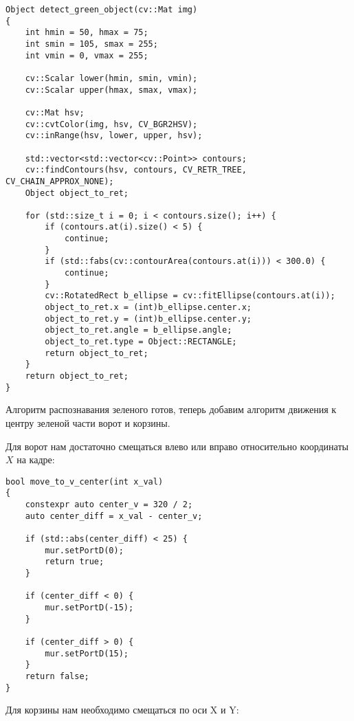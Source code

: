 \begin{verbatim}
Object detect_green_object(cv::Mat img)
{
    int hmin = 50, hmax = 75;
    int smin = 105, smax = 255;
    int vmin = 0, vmax = 255;

    cv::Scalar lower(hmin, smin, vmin);
    cv::Scalar upper(hmax, smax, vmax);

    cv::Mat hsv;
    cv::cvtColor(img, hsv, CV_BGR2HSV);
    cv::inRange(hsv, lower, upper, hsv);

    std::vector<std::vector<cv::Point>> contours;
    cv::findContours(hsv, contours, CV_RETR_TREE, CV_CHAIN_APPROX_NONE);
    Object object_to_ret;

    for (std::size_t i = 0; i < contours.size(); i++) {
        if (contours.at(i).size() < 5) {
            continue;
        }
        if (std::fabs(cv::contourArea(contours.at(i))) < 300.0) {
            continue;
        }
        cv::RotatedRect b_ellipse = cv::fitEllipse(contours.at(i));
        object_to_ret.x = (int)b_ellipse.center.x;
        object_to_ret.y = (int)b_ellipse.center.y;
        object_to_ret.angle = b_ellipse.angle;
        object_to_ret.type = Object::RECTANGLE;
        return object_to_ret;
    }
    return object_to_ret;
}
\end{verbatim}

Алгоритм распознавания зеленого готов, теперь добавим алгоритм движения к центру зеленой части ворот и корзины. 

Для ворот нам достаточно смещаться влево или вправо относительно координаты $X$ на кадре:

\begin{verbatim}
bool move_to_v_center(int x_val)
{
    constexpr auto center_v = 320 / 2;
    auto center_diff = x_val - center_v;

    if (std::abs(center_diff) < 25) {
        mur.setPortD(0);
        return true;
    }

    if (center_diff < 0) {
        mur.setPortD(-15);
    }

    if (center_diff > 0) {
        mur.setPortD(15);
    }
    return false;
}
\end{verbatim}

Для корзины нам необходимо смещаться по оси X и Y:

